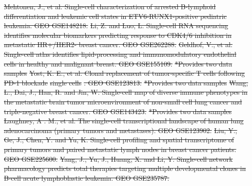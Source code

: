\documentclass[referee, pdflatex, sn-vancouver-num]{sn-jnl}
\providecommand{\DIFdeltex}[1]{{\protect\color{red}\sout{#1}}}                      %
\providecommand{\DIFdel}[1]{\texorpdfstring{\DIFdeltex{#1}}{}} %
\begin{document}
\begin{appendices}
\DIFdel{Mehtonen, J., et al. Single-cell characterization of arrested B-lymphoid differentiation and leukemic cell states in ETV6-RUNX1-positive pediatric leukemia. GEO GSE148218. }%
\DIFdel{Li, Z. and Luo, L. Single-cell RNA sequencing identifies molecular biomarkers predicting response to CDK4/6 inhibition in metastatic HR+/HER2- breast cancer. GEO GSE262288. }%
\DIFdel{Geldhof, V., et al. Single-cell atlas identifies lipid-processing and immunomodulatory endothelial cells in healthy and malignant breast. GEO GSE155109. }%
\DIFdel{*Provides two data samples
	}%
\DIFdel{Yost, K. E., et al. Clonal replacement of tumor-specific T cells following PD-1 blockade }%
\DIFdel{single cells}%
\DIFdel{. GEO GSE123813. }%
\DIFdel{*Provides two data samples
	}%
\DIFdel{Wang, L., Dai, J., Han, R. and Jin, W. Single-cell map of diverse immune phenotypes in the metastatic brain tumor microenvironment of non-small cell lung cancer and triple-negative breast cancer. GEO GSE143423. }%
\DIFdel{*Provides two data samples
	}%
\DIFdel{Laughney, A . M., et al. The single-cell transcriptional landscape of human lung adenocarcinoma (primary tumors and metastases). GEO GSE123902. }%
\DIFdel{Liu, Y., Ge, J., Chen, Y. and Yu, K. Single-cell profiling and spatial transcriptome of primary tumors and paired metastatic lymph nodes in breast cancer patients. GEO GSE225600. }%
\DIFdel{Yang, J., Yu, J., Huang, X. and Li, Y. Single-cell network pharmacology predicts total therapies targeting multiple developmental clones in B-cell acute lymphoblastic leukemia. GEO GSE235787. }%

\end{appendices}
\end{document}

